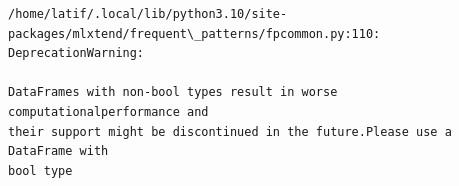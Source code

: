 \documentclass[11pt]{article}
\makeatletter
\newcommand{\boxspacing}{\kern\kvtcb@left@rule\kern\kvtcb@boxsep}
\newcommand{\prompt}[4]{
        {\ttfamily\llap{{\color{#2}[#3]:\hspace{3pt}#4}}\vspace{-\baselineskip}}
    }
\makeatother
\begin{document}
    \begin{Verbatim}[commandchars=\\\{\}]
/home/latif/.local/lib/python3.10/site-
packages/mlxtend/frequent\_patterns/fpcommon.py:110: DeprecationWarning:

DataFrames with non-bool types result in worse computationalperformance and
their support might be discontinued in the future.Please use a DataFrame with
bool type

    \end{Verbatim}

    \begin{tcolorbox}[breakable, size=fbox, boxrule=1pt, pad at break*=1mm,colback=cellbackground, colframe=cellborder]
\prompt{In}{incolor}{ }{\boxspacing}
\begin{Verbatim}[commandchars=\\\{\}]

\end{Verbatim}
\end{tcolorbox}


    
    
    
\end{document}
